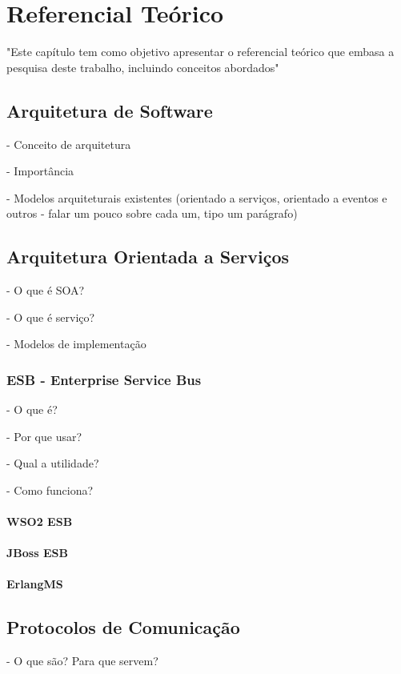 \chapter[Referencial Teórico]{Referencial Teórico}

"Este capítulo tem como objetivo apresentar o referencial teórico que embasa a pesquisa deste trabalho, incluindo conceitos abordados"

\section{Arquitetura de Software}

- Conceito de arquitetura

- Importância

- Modelos arquiteturais existentes (orientado a serviços, orientado a eventos e outros - falar um pouco sobre cada um, tipo um parágrafo)


\section{Arquitetura Orientada a Serviços}

- O que é SOA?

- O que é serviço?

- Modelos de implementação

\subsection{ESB - Enterprise Service Bus}

- O que é?

- Por que usar?

- Qual a utilidade?

- Como funciona?

\subsubsection{WSO2 ESB}


\subsubsection{JBoss ESB}


\subsubsection{ErlangMS}

\section{Protocolos de Comunicação}
- O que são? Para que servem?

